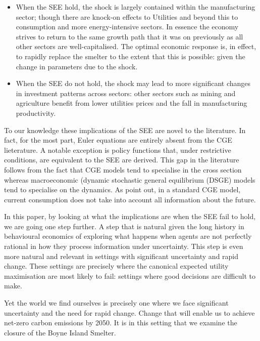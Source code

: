 \documentclass[12pt,a4paper]{article}
\begin{document}
\begin{itemize}
    
  \item When the SEE hold, the shock is largely contained within the
    manufacturing sector; though there are knock-on effects to Utilities and
    beyond this to consumption and more energy-intensive sectors. In essence
    the economy strives to return to the same growth path that it was on
    previously as all other sectors are well-capitalised. The optimal economic
    response is, in effect, to rapidly replace the smelter to the extent that
    this is possible: given the change in parameters due to the shock.

  \item When the SEE do not hold, the shock may lead to more significant
    changes in investment patterns across sectors: other sectors such as mining
    and agriculture benefit from lower utilities prices and the fall in
    manufacturing productivity.

\end{itemize}

To our knowledge these implications of the SEE are novel to the literature.  In
fact, for the most part, Euler equations are entirely absent from the CGE
lieterature.  A notable exception is \cite{Dixon_Rimmer-Euler} policy functions
that, under restrictive conditions, are equivalent to the SEE are derived.
This gap in the literature follows from the fact that CGE models tend to
specialise in the cross section whereas macroeconomic (dynamic stochastic
general equilibrium (DSGE) models tend to specialise on the dynamics.
As \cite{Dixon_Rimmer-Euler} point out, in a standard CGE model, current
consumption does not take into account all information about the future.

In this paper, by looking at what the implications are when the SEE fail to
hold, we are going one step further. A step that is natural given the long
history in behavioural economics of exploring what happens when agents are not
perfectly rational in how they process information under uncertainty.  This
step is even more natural and relevant in settings with significant uncertainty
and rapid change.  These settings are precisely where the canonical expected
utility maximisation are most likely to fail: settings where good decisions are
difficult to make.

Yet the world we find ourselves is precisely one where we face significant
uncertainty and the need for rapid change. Change that will enable us to
achieve net-zero carbon emissions by 2050. It is in this setting that we
examine the closure of the Boyne Island Smelter.
\end{document}
